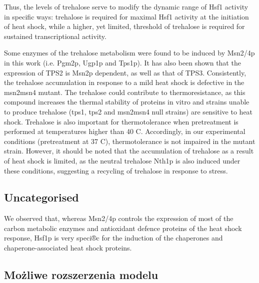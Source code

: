 \documentclass{pracamgr}
\begin{document}
Thus, the levels of trehalose serve to modify
the dynamic range of Hsf1 activity in specific ways: trehalose is
required for maximal Hsf1 activity at the initiation of heat
shock, while a higher, yet limited, threshold of trehalose is
required for sustained transcriptional activity.\cite{TrehaloseRegulatorHsf}

Some enzymes of the trehalose
metabolism were found to be induced by Msn2/4p in this
work (i.e. Pgm2p, Ugp1p and Tps1p). It has also been
shown that the expression of TPS2 is Msn2p dependent, as well as that of TPS3. Consistently, the trehalose
accumulation in response to a mild heat shock is defective in
the msn2msn4 mutant. The trehalose could contribute to thermoresistance, as this compound
increases the thermal stability of proteins in vitro and strains unable to produce trehalose
(tps1, tps2 and msn2msn4 null strains) are sensitive to
heat shock. Trehalose is also important for thermotolerance when pretreatment
is performed at temperatures higher than 40 C. Accordingly, in our experimental conditions
(pretreatment at 37 C), thermotolerance is not impaired in
the mutant strain. However, it should be noted that the
accumulation of trehalose as a result of heat shock is
limited, as the neutral trehalose Nth1p is also induced
under these conditions, suggesting a recycling of trehalose in response to stress.\cite{MsnContraHsf1}


\subsection{Uncategorised}
We observed that, whereas Msn2/4p controls the expression
of most of the carbon metabolic enzymes and antioxidant
defence proteins of the heat shock response, Hsf1p is very
speci®c for the induction of the chaperones and chaperone-associated heat shock proteins.\cite{MsnContraHsf1}


\subsection{Możliwe rozszerzenia modelu}
\end{document}
